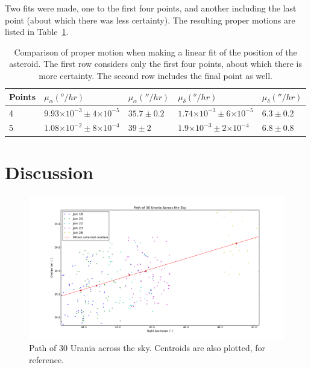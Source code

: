 \documentclass[a4paper,12pt]{article}
\providecommand{\e}[1]{\ensuremath{\times 10^{#1}}}
\begin{document}
Two fits were made, one to the first four points, and another including the last point (about which there was less certainty). The resulting proper motions are listed in Table~\ref{tab:pm}.

\begin{center}
\begin{table}[!htbp]
  \centering
  \begin{tabular}{l||l||l||l||l}
  	Points & $\mu_{\alpha} (^o/hr)$ & $\mu_{\alpha} (''/hr)$ & $\mu_{\delta} (^o/hr)$ & $\mu_{\delta} (''/hr)$ \\
  	\hline
  	4 & $9.93\e{-3}\pm 4\e{-5}$ & $35.7\pm 0.2$ & $1.74\e{-3}\pm 6\e{-5}$& $6.3\pm 0.2$ \\
  	5 & $1.08\e{-2}\pm 8\e{-4}$ & $39\pm 2$ & $1.9\e{-3}\pm 2\e{-4}$ & $6.8\pm 0.8$ \\
   \end{tabular}
    \caption{Comparison of proper motion when making a linear fit of the position of the asteroid. The first row considers only the first four points, about which there is more certainty. The second row includes the final point as well.}
    \label{tab:pm}
\end{table}
\end{center}




\section{Discussion}
\label{sec:discussion}

\begin{figure}[!htbp]
\centering
\includegraphics[width = \linewidth]{path_urania.png}
\caption{Path of 30 Urania across the sky. Centroids are also plotted, for reference.}
\label{fig:path}
\end{figure}
\end{document}
